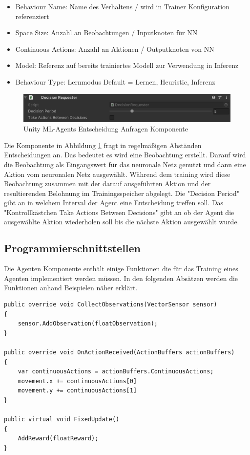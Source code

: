 \begin{itemize}
  \item Behaviour Name: Name des Verhaltens / wird in Trainer Konfiguration referenziert
  \item Space Size: Anzahl an Beobachtungen / Inputknoten für NN
  \item Continuous Actions: Anzahl an Aktionen / Outputknoten von NN
  \item Model: Referenz auf bereits trainiertes Modell zur Verwendung in Inferenz
  \item Behaviour Type: Lernmodus Default = Lernen, Heuristic, Inferenz
\end{itemize}

\begin{figure}[H]
  \centering  
  \includegraphics[scale=0.5]{img/entscheidung_anfragen_komponente.png}
  \caption{Unity ML-Agents Entscheidung Anfragen Komponente}
  \label{fig:entscheidung_anfragen_komponente}
\end{figure}

Die Komponente in Abbildung \ref{fig:entscheidung_anfragen_komponente} fragt in regelmäßigen Abständen Entscheidungen an. Das bedeutet es wird eine Beobachtung erstellt. Darauf wird die Beobachtung als Eingangswert für das neuronale Netz genutzt und dann eine Aktion vom neuronalen Netz ausgewählt. Während dem training wird diese Beobachtung zusammen mit der darauf ausgeführten Aktion und der resultierenden Belohnung im Trainingsspeicher abgelegt. Die "Decision Period" gibt an in welchem Interval der Agent eine Entscheidung treffen soll. Das "Kontrollkästchen Take Actions Between Decisions" gibt an ob der Agent die ausgewählte Aktion wiederholen soll bis die nächste Aktion ausgewählt wurde.

\subsection{Programmierschnittstellen}
\label{subsec:programmierschnittstellen}
Die Agenten Komponente enthält einige Funktionen die für das Training eines Agenten implementiert werden müssen. In den folgenden Absätzen werden die Funktionen anhand Beispielen näher erklärt.

\begin{lstlisting}[caption={Agent Funktionen},captionpos=b,label={lst:agent_funktionen}]
public override void CollectObservations(VectorSensor sensor)
{
    sensor.AddObservation(floatObservation);
}

public override void OnActionReceived(ActionBuffers actionBuffers)
{
    var continuousActions = actionBuffers.ContinuousActions;
    movement.x += continuousActions[0]
    movement.y += continuousActions[1]
}

public virtual void FixedUpdate()
{
    AddReward(floatReward);
}
\end{lstlisting}

